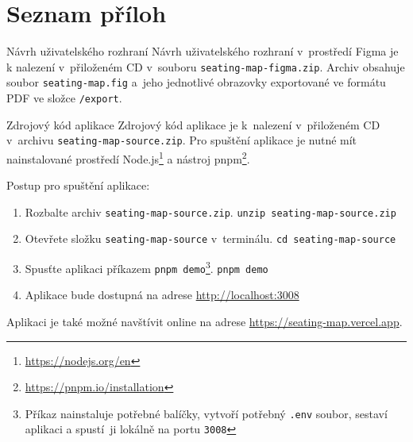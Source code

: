 \appendix
{}
\chapter*{Seznam příloh}
\renewcommand{\thesection}{Příloha \Alph{section}}

\begin{section}{Návrh uživatelského rozhraní}
    \label{appendix:ui-design}
    Návrh uživatelského rozhraní v~prostředí Figma je k nalezení v~přiloženém CD v~souboru \texttt{seating-map-figma.zip}.
    Archiv obsahuje soubor \texttt{seating-map.fig} a~jeho jednotlivé obrazovky exportované ve formátu PDF ve složce \texttt{/export}.
\end{section}
\newpage

\begin{section}{Zdrojový kód aplikace}
    \label{appendix:source-code}
    Zdrojový kód aplikace je k~nalezení v~přiloženém CD v~archivu \texttt{seating-map-source.zip}.
    Pro spuštění aplikace je nutné mít nainstalované prostředí Node.js\footnote{\url{https://nodejs.org/en}} a nástroj pnpm\footnote{\url{https://pnpm.io/installation}}.

    Postup pro spuštění aplikace:

    \begin{enumerate}
        \item Rozbalte archiv \texttt{seating-map-source.zip}.
        \subitem \texttt{unzip seating-map-source.zip}
        \item Otevřete složku \texttt{seating-map-source} v~terminálu.
        \subitem \texttt{cd seating-map-source}
        \item Spusťte aplikaci příkazem \texttt{pnpm demo}\footnote{Příkaz nainstaluje potřebné balíčky, vytvoří potřebný \texttt{.env} soubor, sestaví aplikaci a spustí~ji lokálně na portu \texttt{3008}}.
        \subitem \texttt{pnpm demo}
        \item Aplikace bude dostupná na adrese \url{http://localhost:3008}
    \end{enumerate}

    Aplikaci je také možné navštívit online na adrese \url{https://seating-map.vercel.app}.
\end{section}
